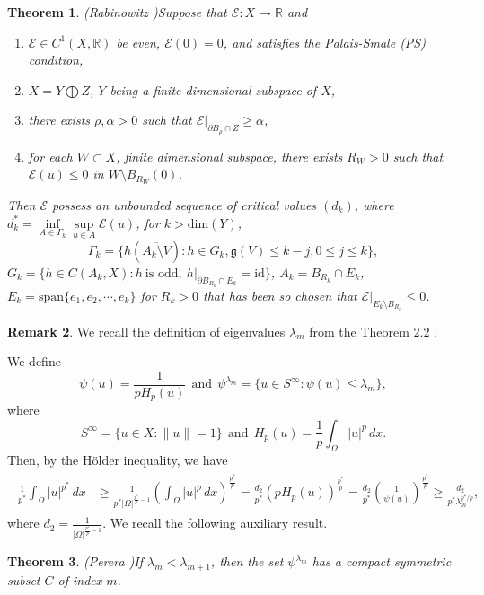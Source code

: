 \documentclass[12pt]{extarticle}
\newtheorem{theorem}{Theorem}[section]
\theoremstyle{definition}
\theoremstyle{remark}
\theoremstyle{definition}
\newtheorem{remark}[theorem]{Remark}
\numberwithin{equation}{section}
\numberwithin{equation}{section}
\begin{document}
	\begin{theorem}{(Rabinowitz \cite[Theorem $9.12$]{PR1})}\label{symm_MP_Thm}
		Suppose that $\mathcal{E}:X\to\mathbb{R}$ and
		\begin{enumerate}[label=(\roman*)]
			\item $\mathcal{E}\in C^1(X,\mathbb{R})$ be even, $\mathcal{E}(0)=0$, and satisfies the Palais-Smale (PS) condition,
			\item $X=Y\bigoplus Z$, $Y$ being a finite dimensional subspace of $X$,
			\item there exists $\rho, \alpha>0$ such that $\mathcal{E}|_{\partial B_{\rho}\cap Z}\geq\alpha$,
			\item for each $W\subset X$, finite dimensional subspace, there exists $R_W>0$ such that $\mathcal{E}(u)\leq 0$ in $W\setminus B_{R_W}(0)$,
		\end{enumerate}
		Then $\mathcal{E}$ possess an unbounded sequence of critical values $(d_k)$, where  $d_k^*=\underset{A\in\Gamma_k}\inf\underset{u\in A}\sup\mathcal{E}(u)$, for $k>\text{dim}(Y)$, $$\Gamma_k=\{h(\overline{A_k\setminus V}):h\in G_k, \mathfrak{g}(V)\leq k-j, 0\leq j\leq k\},$$
		$G_k=\{h\in C(A_k,X):h~\text{is odd},~h|_{\partial B_{R_k}\cap E_k}=\text{id}\}$, $A_k=B_{R_k}\cap E_k$, $E_k=\text{span}\{e_1,e_2,\cdots,e_k\}$ for $R_k>0$ that has been so chosen that $\mathcal{E}|_{E_k\setminus B_{R_k}}\leq 0$.
	\end{theorem}
	 
	\begin{remark}
	 	We recall the definition of eigenvalues $\lambda_{m}$ from the Theorem $2.2$ \cite{perera3}.
	 \end{remark}	 
	 \noindent We define $$\psi(u)=\frac{1}{pH_{p}(u)}~~\text{and}~~\psi^{\lambda_m}=\{u\in S^{\infty}:\psi(u)\leq\lambda_m\},$$ where $$S^{\infty}=\{u\in X:\|u\|=1\}~~\text{and}~~H_{p}(u) = \frac{1}{p} \int_{\Omega} |u|^p \, dx.$$
	 Then, by the H\"{o}lder inequality, we have 
	 \begin{align}\label{H}
	 	\begin{split}
	 		\frac{1}{p^*} \int_{\Omega} |u|^{p^*}\, dx &\geq \frac{1}{p^*|\Omega|^{\frac{p^*}{p}-1}} \left(\int_{\Omega} |u|^p \, dx\right)^{\frac{p^*}{p}} =   \frac{d_2}{p^*} \left(pH_p(u)\right)^{\frac{p^*}{p}} = \frac{d_2}{p^*} \left(\frac{1}{\psi(u)}\right)^{\frac{p^*}{p}} \geq \frac{d_2}{p^*\lambda_m^{p^*/p}},
	 	\end{split}
	 \end{align}
	 where $d_2 = \frac{1}{|\Omega|^{\frac{p^*}{p}-1}}$.	 
	 We recall the following auxiliary result.
	 \begin{theorem}(Perera \cite[Theorem $1.3$]{perera2})\label{aux1}
	 	If $\lambda_m<\lambda_{m+1}$, then the set $\psi^{\lambda_m}$ has a compact symmetric subset $C$ of index $m$.
	 \end{theorem}	 
 
\end{document}

